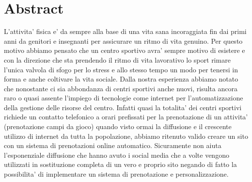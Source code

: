 \section{Abstract}

L'attivita' fisica e' da sempre alla base di una vita sana incoraggiata fin dai primi anni da genitori e insegnanti per assicurare un ritmo di vita genuino.
Per questo motivo abbiamo pensato che un centro sportivo avra' sempre motivo di esistere e con la direzione che sta prendendo il ritmo di vita lavorativo lo sport rimare l'unica valvola di sfogo per lo stress e allo stesso tempo un modo per tenersi in forma e anche coltivare la vita sociale.\newline
Dalla nostra esperienza abbiamo notato che nonostante ci sia abbondanza di centri sportivi anche nuovi, risulta ancora raro o quasi assente l'impiego di tecnologie come internet per l'automatizzazione della gestione delle risorse del centro. 
Infatti quasi la totalita' dei centri sportivi richiede un contatto telefonico a orari prefissati per la prenotazione di un attivita' (prenotazione campi da gioco) quando visto ormai la diffusione e il crescente utilizzo di internet da tutta la popolazione, abbiamo ritenuto valido creare un sito con un sistema di prenotazioni online automatico.\newline
{}
Sicuramente non aiuta l'esponenziale diffusione che hanno avuto i social media che a volte vengono utilizzati in sostituzione completa di un vero e proprio sito negando di fatto la possibilita' di implementare un sistema di prenotazione e personalizzazione.
